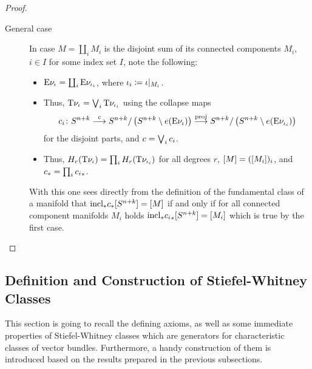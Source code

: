 \begin{Lem}
\begin{proof}
\begin{description}
    \item[General case] In case $M=\coprod_i M_i$ is the disjoint sum of its connected
      components $M_i$, $i\in I$ for some index set $I$, note the following:
      \begin{itemize}
      \item $\mathrm{E}\nu_{{\iota}} = \coprod_i\mathrm{E}\nu_{{\iota}_i}$,
        where ${\iota}_i\coloneqq{\iota}|_{M_i}$.
      \item Thus, $\mathrm{T}{\nu_{{\iota}}} = \bigvee_i\mathrm{T}{\nu_{{\iota}_i}}$ using the
        collapse maps
        \begin{gather*}
          c_i\colon
          S^{n+k}
          \overset{c}{\longrightarrow}
          S^{n+k}/\left(S^{n+k}\setminus e(\mathrm{E}\nu_{{\iota}})\right)
          \overset{\mathrm{proj}}{\longrightarrow}
          S^{n+k}/\left(S^{n+k}\setminus e(\mathrm{E}\nu_{{\iota}_i})\right)
        \end{gather*}
        for the disjoint parts,
        and $c=\bigvee_ic_i$.
      \item Thus, $H_r(\mathrm{T}{\nu_{{\iota}}}) = \prod_i H_r(\mathrm{T}{\nu_{{\iota}_i}})$ for
        all degrees $r$, $[M] = ([M_i])_i$, and
        ${c}_* = \prod_i{c_i}_*$.
      \end{itemize}
      With this one sees directly from the definition of the fundamental
      class of a manifold that
      ${\mathrm{incl}}_*{c}_*[S^{n+k}] = [M]$
      if and only if for all connected component manifolds $M_i$ holds
      ${\mathrm{incl}}_*{c_i}_*[S^{n+k}] = [M_i]$
      which is true by the first case.
      \qedhere
    \end{description}
  \end{proof}
\end{Lem}


\subsection{Definition and Construction of Stiefel-Whitney Classes}
\label{sec:swclasses}
This section is going to recall the defining axioms, as well as some
immediate properties of Stiefel-Whitney classes which are generators
for characteristic classes of vector bundles.
Furthermore, a handy construction of them is introduced based on the
results prepared in the previous subsections.

